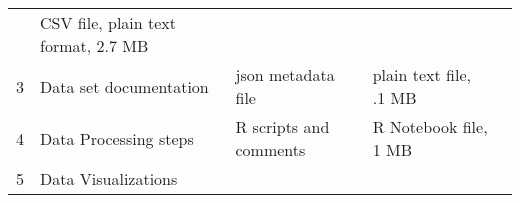 \documentclass[]{article}
\begin{document}
\begin{longtable}[]{@{}cllll@{}}
\begin{minipage}[t]{0.16\columnwidth}
\end{minipage} & \begin{minipage}[t]{0.14\columnwidth}\raggedright\strut
CSV file, plain text format, 2.7 MB\strut
\end{minipage} & \begin{minipage}[t]{0.18\columnwidth}\raggedright\strut
\strut
\end{minipage}\tabularnewline
\begin{minipage}[t]{0.11\columnwidth}\centering\strut
3\strut
\end{minipage} & \begin{minipage}[t]{0.11\columnwidth}\raggedright\strut
Data set documentation\strut
\end{minipage} & \begin{minipage}[t]{0.16\columnwidth}\raggedright\strut
json metadata file\strut
\end{minipage} & \begin{minipage}[t]{0.14\columnwidth}\raggedright\strut
plain text file, .1 MB\strut
\end{minipage} & \begin{minipage}[t]{0.18\columnwidth}\raggedright\strut
\strut
\end{minipage}\tabularnewline
\begin{minipage}[t]{0.11\columnwidth}\centering\strut
4\strut
\end{minipage} & \begin{minipage}[t]{0.11\columnwidth}\raggedright\strut
Data Processing steps\strut
\end{minipage} & \begin{minipage}[t]{0.16\columnwidth}\raggedright\strut
R scripts and comments\strut
\end{minipage} & \begin{minipage}[t]{0.14\columnwidth}\raggedright\strut
R Notebook file, 1 MB\strut
\end{minipage} & \begin{minipage}[t]{0.18\columnwidth}\raggedright\strut
\strut
\end{minipage}\tabularnewline
\begin{minipage}[t]{0.11\columnwidth}\centering\strut
5\strut
\end{minipage} & \begin{minipage}[t]{0.11\columnwidth}\raggedright\strut
Data Visualizations\strut
\end{minipage} & \begin{minipage}[t]{0.16\columnwidth}\raggedright\strut

\end{minipage}
\end{longtable}
\end{document}
